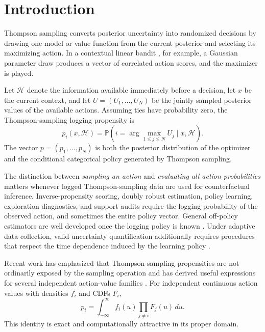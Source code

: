 \documentclass[11pt]{article}
\newcommand{\Prob}{\mathbb{P}}
\begin{document}
\section{Introduction}

Thompson sampling \parencite{thompson1933,chapelle2011,russo2018} converts posterior uncertainty into randomized decisions by drawing one model or value function from the current posterior and selecting its maximizing action. In a contextual linear bandit \parencite{agrawal2013}, for example, a Gaussian parameter draw produces a vector of correlated action scores, and the maximizer is played.

Let $\mathcal{H}$ denote the information available immediately before a decision, let $x$ be the current context, and let $U = (U_1, \ldots, U_N)$ be the jointly sampled posterior values of the available actions. Assuming ties have probability zero, the Thompson-sampling logging propensity is
\[
p_i(x, \mathcal{H})
=
\Prob\!\left( i = \arg\max_{1 \le j \le N} U_j \mid x, \mathcal{H} \right).
\]
The vector $p = (p_1, \ldots, p_N)$ is both the posterior distribution of the optimizer and the conditional categorical policy generated by Thompson sampling.

The distinction between \emph{sampling an action} and \emph{evaluating all action probabilities} matters whenever logged Thompson-sampling data are used for counterfactual inference. Inverse-propensity scoring, doubly robust estimation, policy learning, exploration diagnostics, and support audits require the logging probability of the observed action, and sometimes the entire policy vector. General off-policy estimators are well developed once the logging policy is known \parencite{dudik2011,wang2017}. Under adaptive data collection, valid uncertainty quantification additionally requires procedures that respect the time dependence induced by the learning policy \parencite{hadad2021,zhan2021}.

Recent work has emphasized that Thompson-sampling propensities are not ordinarily exposed by the sampling operation and has derived useful expressions for several independent action-value families \parencite{jeunen2025}. For independent continuous action values with densities $f_i$ and CDFs $F_i$,
\begin{equation}
\label{eq:independent}
p_i = \int_{-\infty}^{\infty} f_i(u) \prod_{j \ne i} F_j(u)\, du.
\end{equation}
This identity is exact and computationally attractive in its proper domain.
\end{document}
